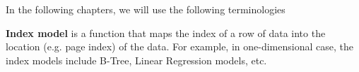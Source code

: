 In the following chapters, we will use the following terminologies

\textbf{Index model} is a function that maps the index of a row of data into the location (e.g. page index) of the data. For example, in one-dimensional case, the index models include B-Tree, Linear Regression models, etc.

